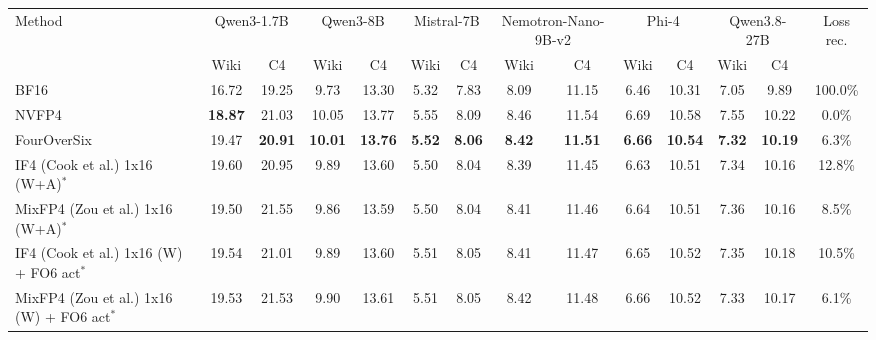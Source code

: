 \begin{tabular}{lccccccccccccc}
\toprule
Method & \multicolumn{2}{c}{Qwen3-1.7B} & \multicolumn{2}{c}{Qwen3-8B} & \multicolumn{2}{c}{Mistral-7B} & \multicolumn{2}{c}{Nemotron-Nano-9B-v2} & \multicolumn{2}{c}{Phi-4} & \multicolumn{2}{c}{Qwen3.8-27B} & Loss rec. \\
 & Wiki & C4 & Wiki & C4 & Wiki & C4 & Wiki & C4 & Wiki & C4 & Wiki & C4 & \\
\midrule
BF16 & 16.72 & 19.25 & 9.73 & 13.30 & 5.32 & 7.83 & 8.09 & 11.15 & 6.46 & 10.31 & 7.05 & 9.89 & 100.0\% \\
NVFP4 & \textbf{18.87} & 21.03 & 10.05 & 13.77 & 5.55 & 8.09 & 8.46 & 11.54 & 6.69 & 10.58 & 7.55 & 10.22 & 0.0\% \\
FourOverSix & 19.47 & \textbf{20.91} & \textbf{10.01} & \textbf{13.76} & \textbf{5.52} & \textbf{8.06} & \textbf{8.42} & \textbf{11.51} & \textbf{6.66} & \textbf{10.54} & \textbf{7.32} & \textbf{10.19} & 6.3\% \\
\midrule
IF4 (Cook et al.) 1x16 (W+A)$^\ast$ & 19.60 & 20.95 & 9.89 & 13.60 & 5.50 & 8.04 & 8.39 & 11.45 & 6.63 & 10.51 & 7.34 & 10.16 & 12.8\% \\
MixFP4 (Zou et al.) 1x16 (W+A)$^\ast$ & 19.50 & 21.55 & 9.86 & 13.59 & 5.50 & 8.04 & 8.41 & 11.46 & 6.64 & 10.51 & 7.36 & 10.16 & 8.5\% \\
IF4 (Cook et al.) 1x16 (W) + FO6 act$^\ast$ & 19.54 & 21.01 & 9.89 & 13.60 & 5.51 & 8.05 & 8.41 & 11.47 & 6.65 & 10.52 & 7.35 & 10.18 & 10.5\% \\
MixFP4 (Zou et al.) 1x16 (W) + FO6 act$^\ast$ & 19.53 & 21.53 & 9.90 & 13.61 & 5.51 & 8.05 & 8.42 & 11.48 & 6.66 & 10.52 & 7.33 & 10.17 & 6.1\% \\
\bottomrule
\end{tabular}

